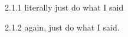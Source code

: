 \begin{Solution}{2.1.1}
	literally just do what I said
\end{Solution}
\begin{Solution}{2.1.2}
	again, just do what I said.
\end{Solution}
